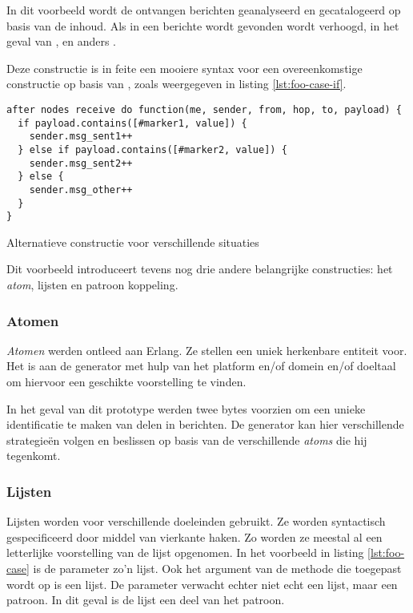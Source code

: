 In dit voorbeeld wordt de ontvangen berichten geanalyseerd en gecatalogeerd op
basis van de inhoud. Als in een berichte  wordt gevonden wordt
 verhoogd, in het geval van , 
en anders .

Deze constructie is in feite een mooiere syntax voor een overeenkomstige
constructie op basis van , zoals weergegeven in listing
\ref{lst:foo-case-if}.

\begin{listing}[ht]
  \begin{verbatim}
after nodes receive do function(me, sender, from, hop, to, payload) {
  if payload.contains([#marker1, value]) {
    sender.msg_sent1++
  } else if payload.contains([#marker2, value]) {
    sender.msg_sent2++
  } else {
    sender.msg_other++
  }
}
  \end{verbatim}
  \vspace{-5mm}
  \caption{Alternatieve constructie voor verschillende situaties}
  \label{lst:foo-case-if}
\end{listing}

Dit voorbeeld introduceert tevens nog drie andere belangrijke constructies: het
\emph{atom}, lijsten en patroon koppeling.

\subsubsection{Atomen}

\emph{Atomen} werden ontleed aan Erlang. Ze stellen een uniek herkenbare
entiteit voor. Het is aan de generator met hulp van het platform en/of domein
en/of doeltaal om hiervoor een geschikte voorstelling te vinden.

In het geval van dit prototype werden twee bytes voorzien om een unieke
identificatie te maken van delen in berichten. De generator kan hier
verschillende strategie\"en volgen en beslissen op basis van de verschillende
\emph{atoms} die hij tegenkomt.

\subsubsection{Lijsten}

Lijsten worden voor verschillende doeleinden gebruikt. Ze worden syntactisch
gespecificeerd door middel van vierkante haken. Zo worden ze meestal al een
letterlijke voorstelling van de lijst opgenomen. In het voorbeeld in listing
\ref{lst:foo-case} is de  parameter zo'n lijst. Ook het argument
van de  methode die toegepast wordt op  is een
lijst. De parameter verwacht echter niet echt een lijst, maar een patroon. In
dit geval is de lijst een deel van het patroon.

